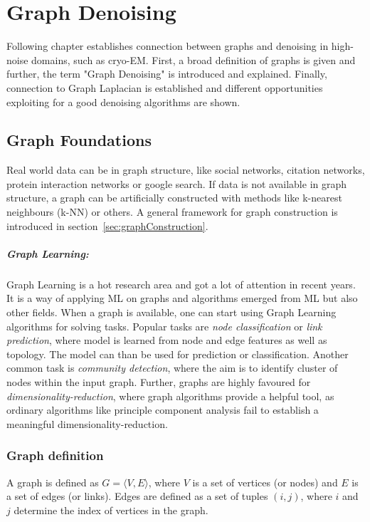 \chapter{Graph Denoising}
\label{sec:graphFoundations}
    

Following chapter establishes connection between graphs and denoising in high-noise 
domains, such as cryo-EM.
First, a broad definition of graphs is given and further, the term "Graph Denoising" is
introduced and explained. Finally, connection to Graph Laplacian is established
and different opportunities exploiting for a good denoising algorithms are shown.


\section{Graph Foundations}
Real world data can be in graph structure, like social networks, citation networks,
protein interaction networks or google search. 
If data is not available in graph structure, a graph can be artificially constructed with methods like k-nearest neighbours (k-NN) or others.
A general framework for graph construction is introduced in section~\ref{sec:graphConstruction}.

\paragraph{Graph Learning:} Graph Learning is a hot research area and got a lot of attention in recent years.
It is a way of applying ML on graphs and algorithms emerged from ML but also other fields.
When a graph is available, one can start using Graph Learning algorithms for solving tasks.
Popular tasks are \textit{node classification} or \textit{link prediction}, where model is learned from node and edge features 
as well as topology. The model can than be used for prediction or classification.
Another common task is \textit{community detection}, where the aim is to identify cluster of nodes within the input graph.
Further, graphs are highly favoured for \textit{dimensionality-reduction}, where 
graph algorithms provide a helpful tool, as ordinary algorithms like principle component analysis fail to 
establish a meaningful dimensionality-reduction.

\subsection{Graph definition}
A graph is defined as $G = \langle V,E \rangle$, where $V$ is a set of 
vertices (or nodes) and $E$ is a set of edges (or links). 
Edges are defined as a set of tuples $(i, j)$, where $i$ and $j$ determine 
the index of vertices in the graph.

